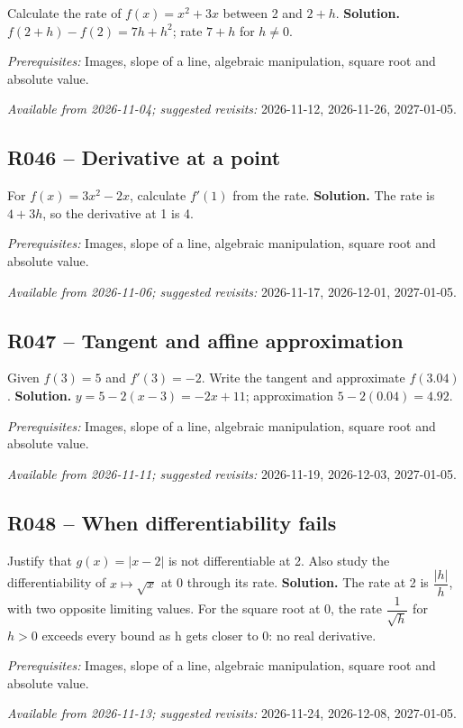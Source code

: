Calculate the rate of $f(x)=x^2+3x$ between 2 and $2+h$.
\ifmxteacher\textbf{Solution.} $f(2+h)-f(2)=7h+h^2$; rate $7+h$ for $h\ne0$.\par\textit{Prerequisites:} Images, slope of a line, algebraic manipulation, square root and absolute value.\par\textit{Available from 2026-11-04; suggested revisits:} 2026-11-12, 2026-11-26, 2027-01-05.\fi
{}\subsection*{R046 -- Derivative at a point}\label{R046}
For $f(x)=3x^2-2x$, calculate $f\prime(1)$ from the rate.
\ifmxteacher\textbf{Solution.} The rate is $4+3h$, so the derivative at 1 is 4.\par\textit{Prerequisites:} Images, slope of a line, algebraic manipulation, square root and absolute value.\par\textit{Available from 2026-11-06; suggested revisits:} 2026-11-17, 2026-12-01, 2027-01-05.\fi
{}\subsection*{R047 -- Tangent and affine approximation}\label{R047}
Given $f(3)=5$ and $f\prime(3)=-2$. Write the tangent and approximate $f(\num{3,04})$.
\ifmxteacher\textbf{Solution.} $y=5-2(x-3)=-2x+11$; approximation $5-2(\num{0,04})=\num{4,92}$.\par\textit{Prerequisites:} Images, slope of a line, algebraic manipulation, square root and absolute value.\par\textit{Available from 2026-11-11; suggested revisits:} 2026-11-19, 2026-12-03, 2027-01-05.\fi
{}\subsection*{R048 -- When differentiability fails}\label{R048}
Justify that $g(x)=|x-2|$ is not differentiable at 2. Also study the differentiability of $x\mapsto\sqrt{x}$ at 0 through its rate.
\ifmxteacher\textbf{Solution.} The rate at 2 is $\dfrac{|h|}{h}$, with two opposite limiting values. For the square root at 0, the rate $\dfrac{1}{\sqrt h}$ for $h>0$ exceeds every bound as h gets closer to 0: no real derivative.\par\textit{Prerequisites:} Images, slope of a line, algebraic manipulation, square root and absolute value.\par\textit{Available from 2026-11-13; suggested revisits:} 2026-11-24, 2026-12-08, 2027-01-05.\fi
